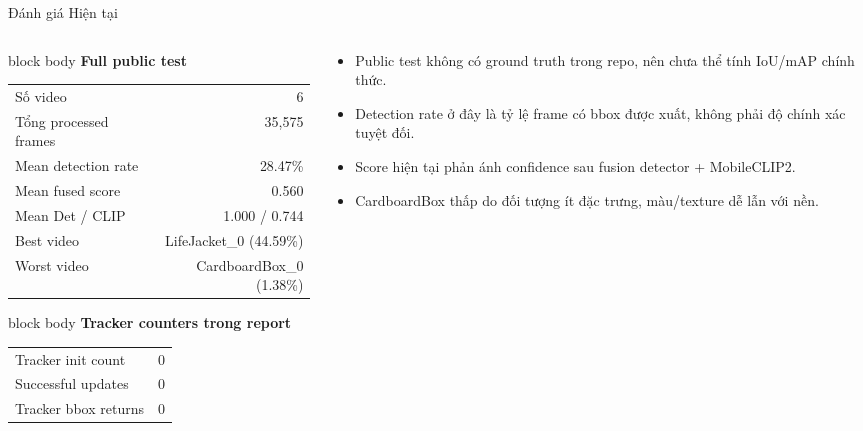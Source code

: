 \documentclass[aspectratio=169]{beamer}
\newcommand{\tightitem}{\setlength\itemsep{0.42em}}
\newenvironment{bluebox}[1]{
  \begin{beamercolorbox}[rounded=true,shadow=false,wd=\linewidth,sep=0.28cm]{block body}
  {\bfseries\color{DeepBlue}#1}\par\vspace{0.12cm}
}{
  \end{beamercolorbox}
}
\begin{document}
\begin{frame}{Đánh giá Hiện tại}
  \begin{columns}[T,onlytextwidth]
    \begin{column}{0.48\textwidth}
      \begin{bluebox}{Full public test}
        \scriptsize
        \begin{tabular}{lr}
          Số video & 6 \\
          Tổng processed frames & 35{,}575 \\
          Mean detection rate & 28.47\% \\
          Mean fused score & 0.560 \\
          Mean Det / CLIP & 1.000 / 0.744 \\
          Best video & LifeJacket\_0 (44.59\%) \\
          Worst video & CardboardBox\_0 (1.38\%) \\
        \end{tabular}
      \end{bluebox}
      \vspace{0.12cm}
      \begin{bluebox}{Tracker counters trong report}
        \scriptsize
        \begin{tabular}{lr}
          Tracker init count & 0 \\
          Successful updates & 0 \\
          Tracker bbox returns & 0 \\
        \end{tabular}
      \end{bluebox}
    \end{column}
    \begin{column}{0.48\textwidth}
      \begin{itemize}
        \tightitem
        \item Public test không có ground truth trong repo, nên chưa thể tính IoU/mAP chính thức.
        \item Detection rate ở đây là tỷ lệ frame có bbox được xuất, không phải độ chính xác tuyệt đối.
        \item Score hiện tại phản ánh confidence sau fusion detector + MobileCLIP2.
        \item CardboardBox thấp do đối tượng ít đặc trưng, màu/texture dễ lẫn với nền.
      \end{itemize}
    \end{column}
  \end{columns}
\end{frame}
\end{document}
